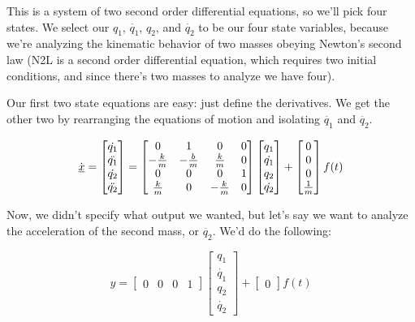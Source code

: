 \documentclass{report}
\begin{document}
\begin{onehalfspacing}
\begin{flushleft}
This is a system of two second order differential equations, so we'll pick four states. We select our \(q_1\), \(\dot{q_1}\), \(q_2\), and \(\dot{q_2}\) to be our four state variables, because we're analyzing the kinematic behavior of two masses obeying Newton's second law (N2L is a second order differential equation, which requires two initial conditions, and since there's two masses to analyze we have four).

\medskip

Our first two state equations are easy: just define the derivatives. We get the other two by rearranging the equations of motion and isolating \(\ddot{q_1}\) and \(\ddot{q_2}\).

\vspace{-0.1in}
\[\dot{\underbar{\(x\)}} = \begin{bmatrix}
    \dot{q_1} \\
    \ddot{q_1} \\
    \dot{q_2} \\ 
    \ddot{q_2}
  \end{bmatrix} = \begin{bmatrix}
    0 & 1 & 0 & 0\\
    -\frac{k}{m} & -\frac{b}{m} & \frac{k}{m} & 0 \\
    0 & 0 & 0 & 1\\
    \frac{k}{m} & 0 & -\frac{k}{m} & 0
\end{bmatrix} \begin{bmatrix}
    q_1 \\
    \dot{q_1} \\
    q_2 \\ 
    \dot{q_2} \end{bmatrix} + \begin{bmatrix}
        0 \\
    0 \\
    0 \\ 
    \frac{1}{m} \end{bmatrix} f(t)\]

Now, we didn't specify what output we wanted, but let's say we want to analyze the acceleration of the second mass, or \(\ddot{q_2}\). We'd do the following:

\vspace{-0.1in}
\[y = \begin{bmatrix} 0 & 0 & 0 & 1\end{bmatrix} \begin{bmatrix}
    q_1 \\
    \dot{q_1} \\
    q_2 \\ 
    \dot{q_2} \end{bmatrix} + \begin{bmatrix} 0 \end{bmatrix} f(t)\]


\end{flushleft}
\end{onehalfspacing}
\end{document}

